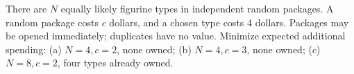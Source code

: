 There are $N$ equally likely figurine types in independent random packages. A random package costs $c$ dollars, and a chosen type costs 4 dollars. Packages may be opened immediately; duplicates have no value. Minimize expected additional spending: (a) $N=4,c=2$, none owned; (b) $N=4,c=3$, none owned; (c) $N=8,c=2$, four types already owned.
